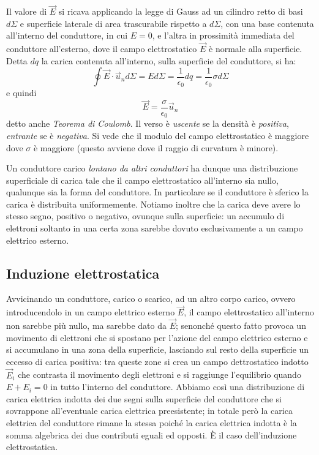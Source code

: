 \documentclass[class=book, crop=false, oneside, 12pt]{standalone}
\begin{document}
Il valore di \(\overrightarrow{E}\) si ricava applicando la legge di Gauss ad un cilindro retto di basi \(d \Sigma\) e superficie laterale di area trascurabile rispetto a \(d \Sigma\), con una base contenuta all'interno del conduttore, in cui \(E = 0\), e l'altra in prossimità immediata del conduttore all'esterno, dove il campo elettrostatico \(\overrightarrow{E}\) è normale alla superficie. 
Detta \(dq\) la carica contenuta all'interno, sulla superficie del conduttore, si ha:
\begin{equation*}
    \oint \overrightarrow{E} \cdot \overrightarrow{u}_n d \Sigma = E d \Sigma = \frac{1}{\epsilon_0} d q = \frac{1}{\epsilon_0} \sigma d \Sigma
\end{equation*}
e quindi
\begin{equation} \label{teorema_coulomb}
    \overrightarrow{E} = \frac{\sigma}{\epsilon_0}\overrightarrow{u}_n
\end{equation}
detto anche \emph{Teorema di Coulomb}. 
Il verso è \emph{uscente} se la densità è \emph{positiva}, \emph{entrante} se è \emph{negativa}. 
Si vede che il modulo del campo elettrostatico è maggiore dove \(\sigma\) è maggiore (questo avviene dove il raggio di curvatura è minore).

Un conduttore carico \emph{lontano da altri conduttori} ha dunque una distribuzione superficiale di carica tale che il campo elettrostatico all'interno sia nullo, qualunque sia la forma del conduttore. 
In particolare se il conduttore è sferico la carica è distribuita uniformemente.
Notiamo inoltre che la carica deve avere lo stesso segno, positivo o negativo, ovunque sulla superficie: un accumulo di elettroni soltanto in una certa zona sarebbe dovuto esclusivamente a un campo elettrico esterno.

\subsection{Induzione elettrostatica}

Avvicinando un conduttore, carico o scarico, ad un altro corpo carico, ovvero introducendolo in un campo elettrico esterno \(\overrightarrow{E}\), il campo elettrostatico all'interno non sarebbe più nullo, ma sarebbe dato da \(\overrightarrow{E}\); senonché questo fatto provoca un movimento di elettroni che si spostano per l'azione del campo elettrico esterno e si accumulano in una zona della superficie, lasciando sul resto della superficie un eccesso di carica positiva: 
tra queste zone si crea un campo dettrostatico indotto \(\overrightarrow{E}_i\) che contrasta il movimento degli elettroni e si raggiunge l'equilibrio quando \(E + E_i = 0\) in tutto l'interno del conduttore.
Abbiamo così una distribuzione di carica elettrica indotta dei due segni sulla superficie del conduttore che si sovrappone all'eventuale carica elettrica preesistente; in totale però la carica elettrica del conduttore rimane la stessa poiché la carica elettrica indotta è la somma algebrica dei due contributi eguali ed opposti.
È il caso dell'induzione elettrostatica.
\end{document}
